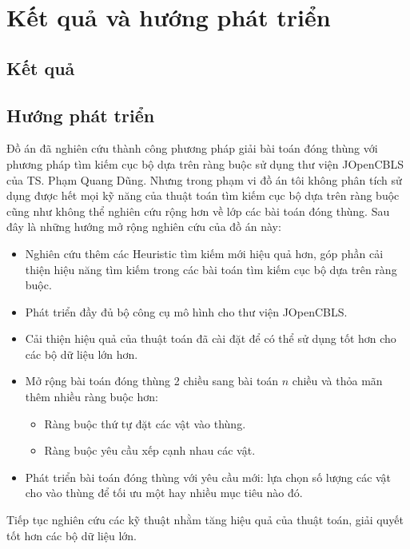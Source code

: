 \chapter{Kết quả và hướng phát triển}
\label{chap:conc}

\section{Kết quả}

\section{Hướng phát triển}

Đồ án đã nghiên cứu thành công phương pháp giải bài toán đóng thùng với phương pháp tìm kiếm cục bộ dựa trên ràng buộc sử dụng thư viện JOpenCBLS của TS. Phạm Quang Dũng. Nhưng trong phạm vi đồ án tôi không phân tích sử dụng được hết mọi kỹ năng của thuật toán tìm kiếm cục bộ dựa trên ràng buộc cũng như không thể nghiên cứu rộng hơn về lớp các bài toán đóng thùng. Sau đây là những hướng mở rộng nghiên cứu của đồ án này:
\begin{itemize}
	\item Nghiên cứu thêm các Heuristic tìm kiếm mới hiệu quả hơn, góp phần cải thiện hiệu năng tìm kiếm trong các bài toán tìm kiếm cục bộ dựa trên ràng buộc.
	\item Phát triển đầy đủ bộ công cụ mô hình cho thư viện JOpenCBLS.
	\item Cải thiện hiệu quả của thuật toán đã cài đặt để có thể sử dụng tốt hơn cho các bộ dữ liệu lớn hơn.
	\item Mở rộng bài toán đóng thùng 2 chiều sang bài toán $n$ chiều và thỏa mãn thêm nhiều ràng buộc hơn:
	\begin{itemize}
		\item Ràng buộc thứ tự đặt các vật vào thùng.
		\item Ràng buộc yêu cầu xếp cạnh nhau các vật.
	\end{itemize}
	\item Phát triển bài toán đóng thùng với yêu cầu mới: lựa chọn số lượng các vật cho vào thùng để tối ưu một hay nhiều mục tiêu nào đó.
\end{itemize}
Tiếp tục nghiên cứu các kỹ thuật nhằm tăng hiệu quả của thuật toán, giải quyết tốt hơn các bộ dữ liệu lớn.



